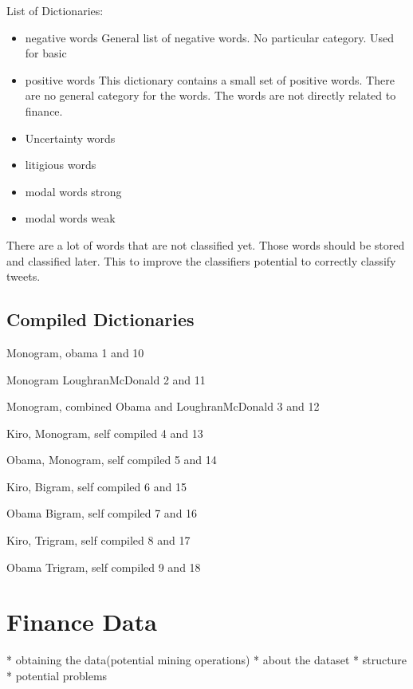 List of Dictionaries:
\begin{itemize}
    \item negative words
General list of negative words. No particular category. Used for basic   
    \item positive words
This dictionary contains a small set of positive words. There are no general
category for the words. The words are not directly related to finance. 
    \item Uncertainty words
    \item litigious words
    \item modal words strong
    \item modal words weak
\end{itemize}

There are a lot of words that are not classified yet. Those words should be
stored and classified later. This to improve the classifiers potential to
correctly classify tweets.  

\subsection{Compiled Dictionaries}

Monogram, obama
1 and 10

Monogram LoughranMcDonald
2 and 11

Monogram, combined Obama and LoughranMcDonald
3 and 12

Kiro, Monogram, self compiled
4 and 13

Obama, Monogram, self compiled
5 and 14

Kiro, Bigram, self compiled
6 and 15

Obama Bigram, self compiled
7 and 16

Kiro, Trigram, self compiled
8 and 17

Obama Trigram, self compiled
9 and 18


\section{Finance Data}
* obtaining the data(potential mining operations)
* about the dataset  
* structure
* potential problems 
